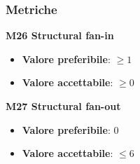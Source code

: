         \subsubsection{Metriche}
            \textbf{M26 Structural fan-in}
                \begin{itemize}
                    \item \textbf{Valore preferibile}: $ \ge 1$
                    \item \textbf{Valore accettabile}: $ \ge 0$
                \end{itemize}
            \textbf{M27 Structural fan-out}
                \begin{itemize}
                    \item \textbf{Valore preferibile}: $0$
                    \item \textbf{Valore accettabile}: $ \le 6$
                \end{itemize}
